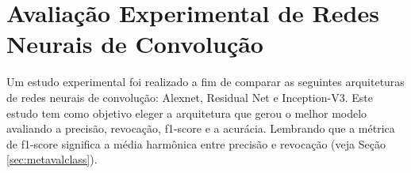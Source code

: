 \section{Avaliação Experimental de Redes Neurais de Convolução}\label{sec:avalexp}

Um estudo experimental foi realizado a fim de comparar as seguintes arquiteturas de redes neurais de convolução: Alexnet, Residual Net e Inception-V3. Este estudo tem como objetivo eleger a arquitetura que gerou o melhor modelo avaliando a precisão, revocação, f1-score e a acurácia. Lembrando que a métrica de f1-score significa a média harmônica entre precisão e revocação (veja Seção \ref{sec:metavalclass}).  



